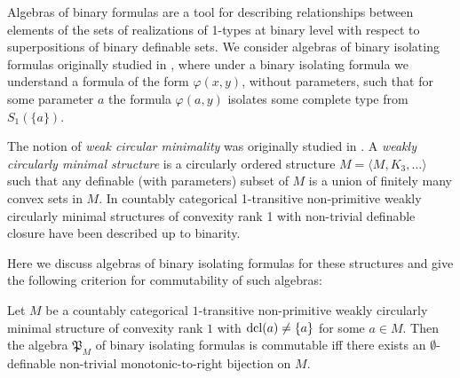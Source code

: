 \documentclass[bsl,meeting]{asl}
\def\urladdr#1{\endgraf\noindent{\it URL Address}: {\tt #1}.}
\newcommand{\NP}{}
\begin{document}
\thispagestyle{empty}


\NP {} 


 



\noindent


Algebras of binary formulas are a tool for describing
relationships between elements of the sets of realizations of
1-types at binary level with respect to superpositions of binary
definable sets. We consider algebras of binary isolating formulas
originally studied in \cite{KScite1, KScite2}, where under a
binary isolating formula we understand a formula of the form
$\varphi(x,y)$, without parameters, such that for some parameter
$a$ the formula $\varphi(a,y)$ isolates some complete type from
$S_1(\{a\})$.

The notion of {\it weak circular minimality} was originally
studied in \cite{KScite3}. A {\it weakly circularly minimal
structure} is a circularly ordered structure $M=\langle M,
K_3,\ldots\rangle$ such that any definable (with parameters)
subset of $M$ is a union of finitely many convex sets in $M$. In
\cite{KScite4} countably categorical 1-transitive non-primitive
weakly circularly minimal structures of convexity rank 1 with
non-trivial definable closure have been described up to binarity.

Here we discuss algebras of binary isolating formulas for these
structures and give the following criterion for commutability of
such algebras:

\begin{theorem}
Let $M$ be a countably categorical $1$-transitive non-primitive
weakly circularly minimal structure of convexity rank $1$ with
${\rm dcl}(a)\ne \{a\}$ for some $a\in M$. Then the algebra
$\mathfrak{P}_{M}$ of binary isolating formulas is commutable iff
there exists an $\emptyset$-definable non-trivial monotonic-to-right bijection
on $M$.
\end{theorem}
\end{document}
